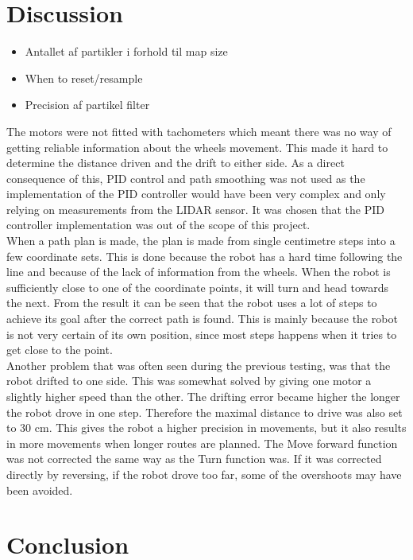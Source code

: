 \chapter{Discussion}
\begin{itemize}
\item Antallet af partikler i forhold til map size
\item When to reset/resample
\item Precision af partikel filter
\end{itemize}
The motors were not fitted with tachometers which meant there was no way of getting reliable information about the wheels movement. This made it hard to determine the distance driven and the drift to either side. As a direct consequence of this, PID control and path smoothing was not used as the implementation of the PID controller would have been very complex and only relying on measurements from the LIDAR sensor. It was chosen that the PID controller implementation was out of the scope of this project. \\
When a path plan is made, the plan is made from single centimetre steps into a  few coordinate sets. This is done because the robot has a hard time following the line and because of the lack of information from the wheels. When the robot is sufficiently close to one of the coordinate points, it will turn and head towards the next.
From the result it can be seen that the robot uses a lot of steps to achieve its goal after the correct path is found. This is mainly because the robot is not very certain of its own position, since most steps happens when it tries to get close to the point.\\
Another problem that was often seen during the previous testing, was that the robot drifted to one side. This was somewhat solved by giving one motor a slightly higher speed than the other. The drifting error became higher the longer the robot drove in one step. Therefore the maximal distance to drive was also set to 30 cm. This gives the robot a higher precision in movements, but it also results in more movements when longer routes are planned.
The Move forward function was not corrected the same way as the Turn function was. If it was corrected directly by reversing, if the robot drove too far, some of the overshoots may have been avoided.\\



\chapter{Conclusion}
